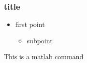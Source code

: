 \documentclass{beamer}
\newenvironment{slide}
    {\begin{frame}[fragile,environment=slide]}
    {\end{frame}}
\begin{document}
\begin{slide}
\frametitle{title}
\begin{itemize}
    \item first point
    \begin{itemize}
        \item subpoint
    \end{itemize}
\end{itemize}
\begin{myMPcolor}
This is a matlab command
\end{myMPcolor}
\end{slide} 
\end{document}
